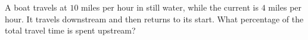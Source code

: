 A boat travels at $10$ miles per hour in still water, while the current is $4$ miles per hour. It travels downstream and then returns to its start. What percentage of the total travel time is spent upstream?
